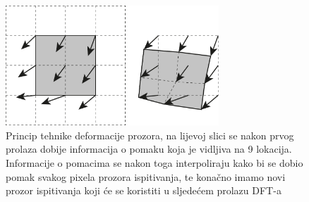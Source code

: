 \begin{figure}[h]  
	\centering
	\includegraphics[width=8cm]{./2_DPIV/TehnikaDeformacijeProzora.pdf} 
	\caption{Princip tehnike deformacije prozora, na lijevoj slici se nakon prvog prolaza dobije informacija o pomaku koja je vidljiva na 9 lokacija. Informacije o pomacima se nakon toga interpoliraju kako bi se dobio pomak svakog pixela prozora ispitivanja, te konačno imamo novi prozor ispitivanja koji će se koristiti u sljedećem prolazu DFT-a \cite{thielicke2014_phd}}
	\label{Tehnika deformacije prozora}
\end{figure}
\FloatBarrier
